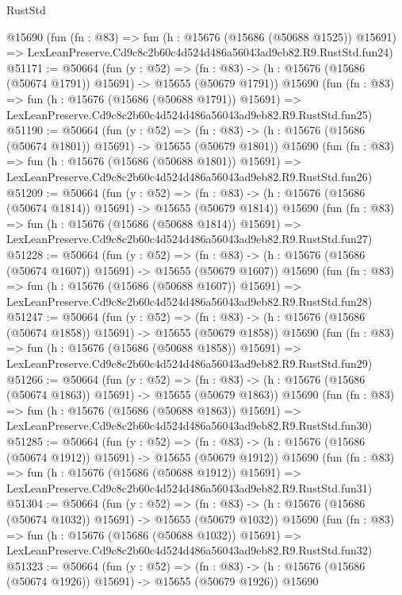 \begin{lexlean}{RustStd}
\begin{coremodule}
    @15690
    (fun (fn : @83) =>
    fun (h : @15676 (@15686 (@50688 @1525)) @15691) =>
    LexLeanPreserve.Cd9c8c2b60c4d524d486a56043ad9eb82.R9.RustStd.fun24)
@51171 := @50664
    (fun (y : @52) =>
    (fn : @83) -> (h : @15676 (@15686 (@50674 @1791)) @15691) -> @15655 (@50679 @1791))
    @15690
    (fun (fn : @83) =>
    fun (h : @15676 (@15686 (@50688 @1791)) @15691) =>
    LexLeanPreserve.Cd9c8c2b60c4d524d486a56043ad9eb82.R9.RustStd.fun25)
@51190 := @50664
    (fun (y : @52) =>
    (fn : @83) -> (h : @15676 (@15686 (@50674 @1801)) @15691) -> @15655 (@50679 @1801))
    @15690
    (fun (fn : @83) =>
    fun (h : @15676 (@15686 (@50688 @1801)) @15691) =>
    LexLeanPreserve.Cd9c8c2b60c4d524d486a56043ad9eb82.R9.RustStd.fun26)
@51209 := @50664
    (fun (y : @52) =>
    (fn : @83) -> (h : @15676 (@15686 (@50674 @1814)) @15691) -> @15655 (@50679 @1814))
    @15690
    (fun (fn : @83) =>
    fun (h : @15676 (@15686 (@50688 @1814)) @15691) =>
    LexLeanPreserve.Cd9c8c2b60c4d524d486a56043ad9eb82.R9.RustStd.fun27)
@51228 := @50664
    (fun (y : @52) =>
    (fn : @83) -> (h : @15676 (@15686 (@50674 @1607)) @15691) -> @15655 (@50679 @1607))
    @15690
    (fun (fn : @83) =>
    fun (h : @15676 (@15686 (@50688 @1607)) @15691) =>
    LexLeanPreserve.Cd9c8c2b60c4d524d486a56043ad9eb82.R9.RustStd.fun28)
@51247 := @50664
    (fun (y : @52) =>
    (fn : @83) -> (h : @15676 (@15686 (@50674 @1858)) @15691) -> @15655 (@50679 @1858))
    @15690
    (fun (fn : @83) =>
    fun (h : @15676 (@15686 (@50688 @1858)) @15691) =>
    LexLeanPreserve.Cd9c8c2b60c4d524d486a56043ad9eb82.R9.RustStd.fun29)
@51266 := @50664
    (fun (y : @52) =>
    (fn : @83) -> (h : @15676 (@15686 (@50674 @1863)) @15691) -> @15655 (@50679 @1863))
    @15690
    (fun (fn : @83) =>
    fun (h : @15676 (@15686 (@50688 @1863)) @15691) =>
    LexLeanPreserve.Cd9c8c2b60c4d524d486a56043ad9eb82.R9.RustStd.fun30)
@51285 := @50664
    (fun (y : @52) =>
    (fn : @83) -> (h : @15676 (@15686 (@50674 @1912)) @15691) -> @15655 (@50679 @1912))
    @15690
    (fun (fn : @83) =>
    fun (h : @15676 (@15686 (@50688 @1912)) @15691) =>
    LexLeanPreserve.Cd9c8c2b60c4d524d486a56043ad9eb82.R9.RustStd.fun31)
@51304 := @50664
    (fun (y : @52) =>
    (fn : @83) -> (h : @15676 (@15686 (@50674 @1032)) @15691) -> @15655 (@50679 @1032))
    @15690
    (fun (fn : @83) =>
    fun (h : @15676 (@15686 (@50688 @1032)) @15691) =>
    LexLeanPreserve.Cd9c8c2b60c4d524d486a56043ad9eb82.R9.RustStd.fun32)
@51323 := @50664
    (fun (y : @52) =>
    (fn : @83) -> (h : @15676 (@15686 (@50674 @1926)) @15691) -> @15655 (@50679 @1926))
    @15690

\end{coremodule}
\end{lexlean}
